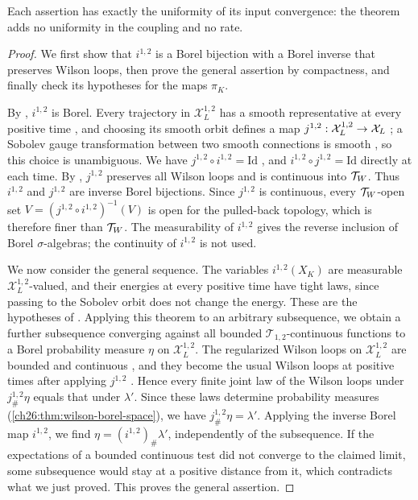 Each assertion has exactly the uniformity of its input convergence: the theorem adds no uniformity in the coupling and no rate.

\begin{proof}
We first show that $i^{1,2}$ is a Borel bijection with a Borel inverse that preserves Wilson loops, then prove the general assertion by compactness, and finally check its hypotheses for the maps $\pi_K$.

By \cite[Lemma~3.84, pp.~47--48]{CCState2023v4}, $i^{1,2}$ is Borel. Every trajectory in $\mathcal X_L^{1,2}$ has a smooth representative at every positive time \cite[Lemma~3.85, p.~48]{CCState2023v4}, and choosing its smooth orbit defines a map $j^{1,2}:\mathcal X_L^{1,2}\to\mathcal X_L$ \cite[Definition~3.86, p.~48]{CCState2023v4}; a Sobolev gauge transformation between two smooth connections is smooth \cite[Lemma~3.10, p.~24]{CCState2023v4}, so this choice is unambiguous. We have $j^{1,2}\circ i^{1,2}=\mathrm{Id}$ \cite[Lemma~3.87, p.~48]{CCState2023v4}, and $i^{1,2}\circ j^{1,2}=\mathrm{Id}$ directly at each time. By \cite[Lemmas~3.88--3.89, pp.~48--49]{CCState2023v4}, $j^{1,2}$ preserves all Wilson loops and is continuous into $\mathcal T_W$. Thus $i^{1,2}$ and $j^{1,2}$ are inverse Borel bijections. Since $j^{1,2}$ is continuous, every $\mathcal T_W$-open set $V=(j^{1,2}\circ i^{1,2})^{-1}(V)$ is open for the pulled-back topology, which is therefore finer than $\mathcal T_W$. The measurability of $i^{1,2}$ gives the reverse inclusion of Borel $\sigma$-algebras; the continuity of $i^{1,2}$ is not used.

We now consider the general sequence. The variables $i^{1,2}(X_K)$ are measurable $\mathcal X_L^{1,2}$-valued, and their energies at every positive time have tight laws, since passing to the Sobolev orbit does not change the energy. These are the hypotheses of \cite[Theorem~3.73, pp.~41--42]{CCState2023v4}. Applying this theorem to an arbitrary subsequence, we obtain a further subsequence converging against all bounded $\mathcal T_{1,2}$-continuous functions to a Borel probability measure $\eta$ on $\mathcal X_L^{1,2}$. The regularized Wilson loops on $\mathcal X_L^{1,2}$ are bounded and continuous \cite[Definition~3.82, p.~47]{CCState2023v4}, and they become the usual Wilson loops at positive times after applying $j^{1,2}$ \cite[Lemma~3.88, p.~48]{CCState2023v4}. Hence every finite joint law of the Wilson loops under $j^{1,2}_\#\eta$ equals that under $\lambda'$. Since these laws determine probability measures (\cref{ch26:thm:wilson-borel-space}), we have $j^{1,2}_\#\eta=\lambda'$. Applying the inverse Borel map $i^{1,2}$, we find $\eta=(i^{1,2})_\#\lambda'$, independently of the subsequence. If the expectations of a bounded continuous test did not converge to the claimed limit, some subsequence would stay at a positive distance from it, which contradicts what we just proved. This proves the general assertion.


\end{proof}
